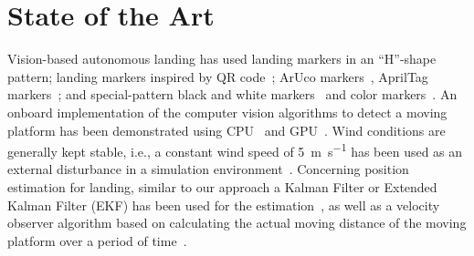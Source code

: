 \documentclass[conference]{IEEEtran}
\begin{document}
\section{State of the Art}
\label{sec:state-of-the-art}

\newcommand{\Xcite}[1]{}


Vision-based autonomous landing has used landing markers
 in an ``H''-shape
pattern; %
landing markers inspired by QR code~\cite{yuan2018hierarchical};
ArUco markers~\cite{lee2012autonomous}\Xcite{yang2018hybrid}, AprilTag markers~\cite{araar2017vision}\Xcite{kyristsis2016towards,feng2018autonomous,olson2011apriltag}; and special-pattern black and white markers~\cite{nguyen2018lightdenseyolo}\Xcite{falanga2017vision} and color markers~\Xcite{chen2016system}\cite{lee2016vision}.  
An onboard implementation of the computer vision algorithms to detect a moving platform has been demonstrated using CPU~\cite{chen2016system}\Xcite{lee2016vision,falanga2017vision} and GPU~\cite{yang2018hybrid}\Xcite{nguyen2018lightdenseyolo,kyristsis2016towards}.
% 
Wind conditions are generally kept stable, i.e.,
a constant wind speed of \SI{5}{\m \per \s} has been used as an external disturbance in a
simulation environment~\cite{feng2018autonomous}. 
%
Concerning %
position estimation for landing,
similar to our approach a Kalman Filter or Extended Kalman Filter (EKF) has been used for the
estimation~\cite{falanga2017vision}\Xcite{araar2017vision,feng2018autonomous,
  saripalli2003landing}, as well as a velocity observer algorithm based on calculating the actual
moving distance of the moving platform over a period of time~\cite{yang2018hybrid}.
\end{document}
